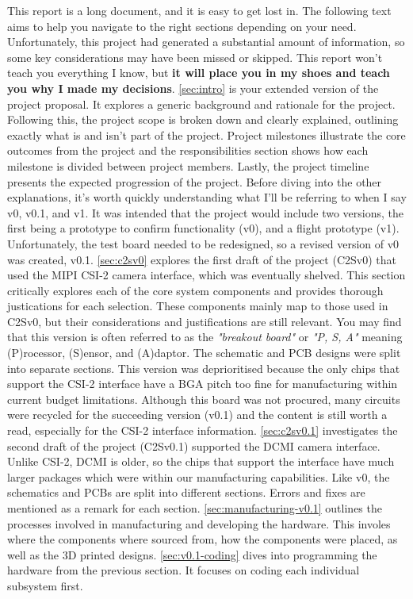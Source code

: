 This report is a long document, and it is easy to get lost in. The following text aims to help you navigate to the right sections depending on your need. Unfortunately, this project had generated a substantial amount of information, so some key considerations may have been missed or skipped. This report won't teach you everything I know, but \textbf{it will place you in my shoes and teach you why I made my decisions}.
\nl
\autoref{sec:intro} is your extended version of the project proposal. It explores a generic background and rationale for the project. Following this, the project scope is broken down and clearly explained, outlining exactly what is and isn't part of the project. Project milestones illustrate the core outcomes from the project and the responsibilities section shows how each milestone is divided between project members. Lastly, the project timeline presents the expected progression of the project.
\nl
Before diving into the other explanations, it's worth quickly understanding what I'll be referring to when I say v0, v0.1, and v1. It was intended that the project would include two versions, the first being a prototype to confirm functionality (v0), and a flight prototype (v1). Unfortunately, the test board needed to be redesigned, so a revised version of v0 was created, v0.1.
\nl
\autoref{sec:c2sv0} explores the first draft of the project (C2Sv0) that used the MIPI CSI-2 camera interface, which was eventually shelved. This section critically explores each of the core system components and provides thorough justications for each selection. These components mainly map to those used in C2Sv0, but their considerations and justifications are still relevant. You may find that this version is often referred to as the \textit{"breakout board"} or \textit{"P, S, A"} meaning (P)rocessor, (S)ensor, and (A)daptor. The schematic and PCB designs were split into separate sections. This version was deprioritised because the only chips that support the CSI-2 interface have a BGA pitch too fine for manufacturing within current budget limitations. Although this board was not procured, many circuits were recycled for the succeeding version (v0.1) and the content is still worth a read, especially for the CSI-2 interface information.
\nl
\autoref{sec:c2sv0.1} investigates the second draft of the project (C2Sv0.1) supported the DCMI camera interface. Unlike CSI-2, DCMI is older, so the chips that support the interface have much larger packages which were within our manufacturing capabilities. Like v0, the schematics and PCBs are split into different sections. Errors and fixes are mentioned as a remark for each section. \autoref{sec:manufacturing-v0.1} outlines the processes involved in manufacturing and developing the hardware. This involes where the components where sourced from, how the components were placed, as well as the 3D printed designs. \autoref{sec:v0.1-coding} dives into programming the hardware from the previous section. It focuses on coding each individual subsystem first.
